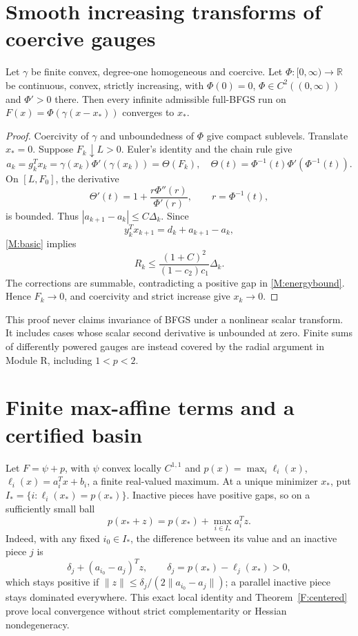 \section{Smooth increasing transforms of coercive gauges}
\begin{theorem}\label{F:transform}
Let $\gamma$ be finite convex, degree-one homogeneous and coercive. Let $\Phi:[0,\infty)\to\mathbb R$ be continuous, convex, strictly increasing, with $\Phi(0)=0$, $\Phi\in C^2((0,\infty))$ and $\Phi'>0$ there. Then every infinite admissible full-BFGS run on $F(x)=\Phi(\gamma(x-x_*))$ converges to $x_*$.
\end{theorem}
\begin{proof}
Coercivity of $\gamma$ and unboundedness of $\Phi$ give compact sublevels. Translate $x_*=0$. Suppose $F_k\downarrow L>0$. Euler's identity and the chain rule give
\[
 a_k=g_k^Tx_k=\gamma(x_k)\Phi'(\gamma(x_k))=\Theta(F_k),
\quad\Theta(t)=\Phi^{-1}(t)\Phi'(\Phi^{-1}(t)).
\]
On $[L,F_0]$, the derivative
\[
 \Theta'(t)=1+\frac{r\Phi''(r)}{\Phi'(r)},\qquad r=\Phi^{-1}(t),
\]
is bounded. Thus $|a_{k+1}-a_k|\le C\Delta_k$. Since
\[
 y_k^Tx_{k+1}=d_k+a_{k+1}-a_k,
\]
\eqref{M:basic} implies
\[
 R_k\le\frac{(1+C)^2}{(1-c_2)c_1}\Delta_k.
\]
The corrections are summable, contradicting a positive gap in \eqref{M:energybound}. Hence $F_k\to0$, and coercivity and strict increase give $x_k\to0$.
\end{proof}
This proof never claims invariance of BFGS under a nonlinear scalar transform. It includes cases whose scalar second derivative is unbounded at zero. Finite sums of differently powered gauges are instead covered by the radial argument in Module R, including $1<p<2$.

\section{Finite max-affine terms and a certified basin}
Let $F=\psi+p$, with $\psi$ convex locally $C^{1,1}$ and $p(x)=\max_i\ell_i(x)$, $\ell_i(x)=a_i^Tx+b_i$, a finite real-valued maximum. At a unique minimizer $x_*$, put $I_*=\{i:\ell_i(x_*)=p(x_*)\}$. Inactive pieces have positive gaps, so on a sufficiently small ball
\begin{equation}\label{F:active}
 p(x_*+z)=p(x_*)+\max_{i\in I_*}a_i^Tz.
\end{equation}
Indeed, with any fixed $i_0\in I_*$, the difference between its value and an inactive piece $j$ is
\[
 \delta_j+(a_{i_0}-a_j)^Tz,\qquad \delta_j=p(x_*)-\ell_j(x_*)>0,
\]
which stays positive if $\|z\|\le\delta_j/(2\|a_{i_0}-a_j\|)$; a parallel inactive piece stays dominated everywhere. This exact local identity and Theorem~\ref{F:centered} prove local convergence without strict complementarity or Hessian nondegeneracy.

